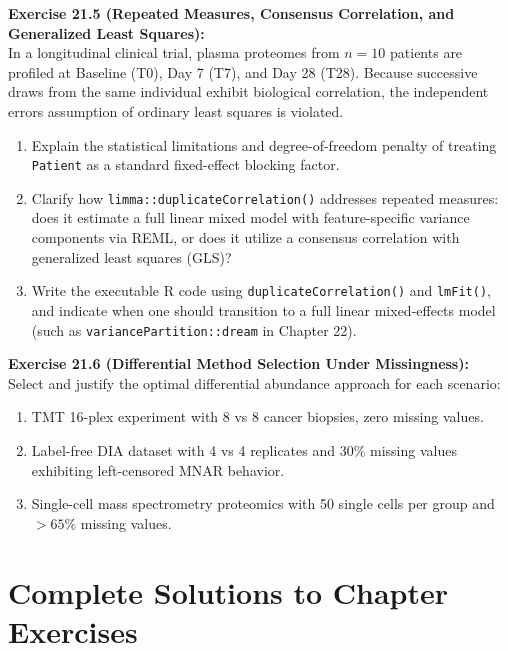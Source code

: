 \documentclass[11pt,twoside,openright]{book}
\begin{document}
\vspace{0.5em}
\noindent
\textbf{Exercise 21.5 (Repeated Measures, Consensus Correlation, and Generalized Least Squares):}\\
In a longitudinal clinical trial, plasma proteomes from $n = 10$ patients are profiled at Baseline (T0), Day 7 (T7), and Day 28 (T28). Because successive draws from the same individual exhibit biological correlation, the independent errors assumption of ordinary least squares is violated.
\begin{enumerate}
    \item Explain the statistical limitations and degree-of-freedom penalty of treating \texttt{Patient} as a standard fixed-effect blocking factor.
    \item Clarify how \texttt{limma::duplicateCorrelation()} addresses repeated measures: does it estimate a full linear mixed model with feature-specific variance components via REML, or does it utilize a consensus correlation with generalized least squares (GLS)? 
    \item Write the executable R code using \texttt{duplicateCorrelation()} and \texttt{lmFit()}, and indicate when one should transition to a full linear mixed-effects model (such as \texttt{variancePartition::dream} in Chapter 22).
\end{enumerate}

\vspace{0.5em}
\noindent
\textbf{Exercise 21.6 (Differential Method Selection Under Missingness):}\\
Select and justify the optimal differential abundance approach for each scenario:
\begin{enumerate}
    \item TMT 16-plex experiment with 8 vs 8 cancer biopsies, zero missing values.
    \item Label-free DIA dataset with 4 vs 4 replicates and $30\%$ missing values exhibiting left-censored MNAR behavior.
    \item Single-cell mass spectrometry proteomics with 50 single cells per group and $> 65\%$ missing values.
\end{enumerate}

\section{Complete Solutions to Chapter Exercises}
\end{document}
